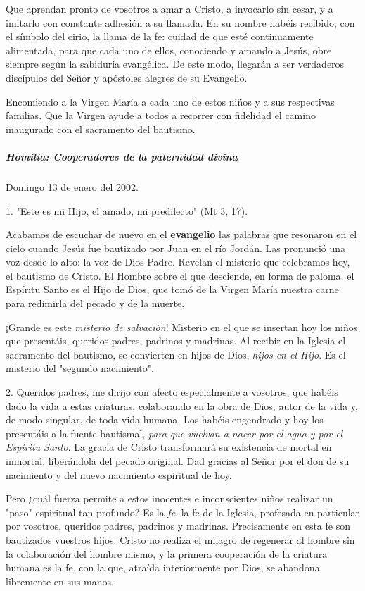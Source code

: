 \documentclass[]{article}
\let\oldsubparagraph\subparagraph
\renewcommand{\subparagraph}[1]{\oldsubparagraph{#1}\mbox{}}
\begin{document}
Que aprendan pronto de vosotros a amar a Cristo, a invocarlo sin cesar,
y a imitarlo con constante adhesión a su llamada. En su nombre habéis
recibido, con el símbolo del cirio, la llama de la fe: cuidad de que
esté continuamente alimentada, para que cada uno de ellos, conociendo y
amando a Jesús, obre siempre según la sabiduría evangélica. De este
modo, llegarán a ser verdaderos discípulos del Señor y apóstoles alegres
de su Evangelio.

Encomiendo a la Virgen María a cada uno de estos niños y a sus
respectivas familias. Que la Virgen ayude a todos a recorrer con
fidelidad el camino inaugurado con el sacramento del bautismo.

\subparagraph{Homilía: Cooperadores de la paternidad
divina}\label{homiluxeda-cooperadores-de-la-paternidad-divina}

Domingo 13 de enero del 2002.

1. "Este es mi Hijo, el amado, mi predilecto" (Mt 3, 17).

Acabamos de escuchar de nuevo en el \textbf{evangelio} las palabras que
resonaron en el cielo cuando Jesús fue bautizado por Juan en el río
Jordán. Las pronunció una voz desde lo alto: la voz de Dios Padre.
Revelan el misterio que celebramos hoy, el bautismo de Cristo. El Hombre
sobre el que desciende, en forma de paloma, el Espíritu Santo es el Hijo
de Dios, que tomó de la Virgen María nuestra carne para redimirla del
pecado y de la muerte.

¡Grande es este \emph{misterio de salvación}! Misterio en el que se
insertan hoy los niños que presentáis, queridos padres, padrinos y
madrinas. Al recibir en la Iglesia el sacramento del bautismo, se
convierten en hijos de Dios, \emph{hijos en el Hijo}. Es el misterio del
"segundo nacimiento".

2. Queridos padres, me dirijo con afecto especialmente a vosotros, que
habéis dado la vida a estas criaturas, colaborando en la obra de Dios,
autor de la vida y, de modo singular, de toda vida humana. Los habéis
engendrado y hoy los presentáis a la fuente bautismal, \emph{para que
vuelvan a nacer por el agua y por el Espíritu Santo}. La gracia de
Cristo transformará su existencia de mortal en inmortal, liberándola del
pecado original. Dad gracias al Señor por el don de su nacimiento y del
nuevo nacimiento espiritual de hoy.

Pero ¿cuál fuerza permite a estos inocentes e inconscientes niños
realizar un "paso" espiritual tan profundo? Es la \emph{fe}, la fe de la
Iglesia, profesada en particular por vosotros, queridos padres, padrinos
y madrinas. Precisamente en esta fe son bautizados vuestros hijos.
Cristo no realiza el milagro de regenerar al hombre sin la colaboración
del hombre mismo, y la primera cooperación de la criatura humana es la
fe, con la que, atraída interiormente por Dios, se abandona libremente
en sus manos.
\end{document}
